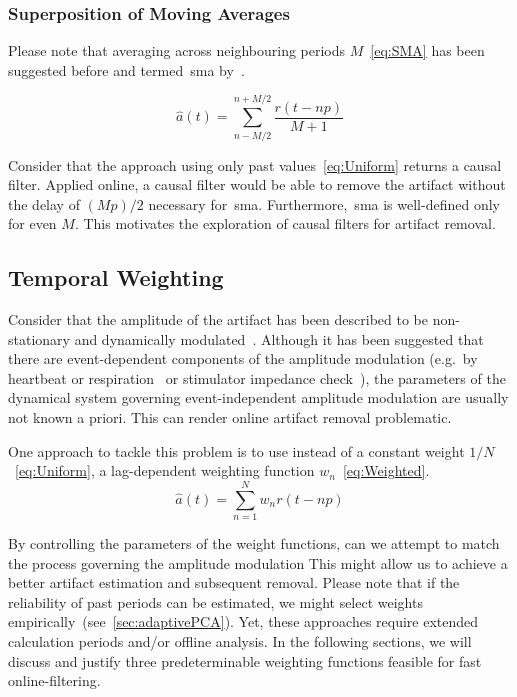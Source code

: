 \documentclass[a4paper]{article}
\newcommand{\secref}[1]{(see~\ref{#1})}
\begin{document}
\subsubsection{Superposition of Moving Averages}\label{sec:sma}

Please note that averaging across neighbouring periods $M$~\eqref{eq:SMA} has been suggested before and termed~\gls{sma} by~\cite{Kohli_2015}.

\begin{equation}
    \hat{a}(t) = \sum_{n-M/2}^{n+M/2} \frac{r(t - np)}{M+1}\label{eq:SMA}
\end{equation}

Consider that the approach using only past values~\eqref{eq:Uniform} returns a causal filter. Applied online, a causal filter would be able to remove the artifact without the delay of $(Mp)/2$ necessary for~\gls{sma}. Furthermore,~\gls{sma} is well-defined only for even $M$. This motivates the exploration of causal filters for artifact removal.

\subsection{Temporal Weighting}

Consider that the amplitude of the  artifact has been described to be non-stationary and dynamically modulated~\citep{Noury_2016,Neuling_2017}.
Although it has been suggested that there are event-dependent components of the amplitude modulation (e.g.\ by heartbeat or respiration~\cite{Noury_2016} or stimulator impedance check~\cite{Neuling_2017}), the parameters of the dynamical system governing event-independent amplitude modulation are usually not known a priori. This can render online artifact removal problematic.

One approach to tackle this problem is to use instead of a constant weight $1/N$~\eqref{eq:Uniform}, a lag-dependent weighting function $w_n$~\eqref{eq:Weighted}.
\begin{equation}
    \hat{a}(t) = \sum_{n=1}^{N} w_n r(t - np)\label{eq:Weighted}
\end{equation}

By controlling the parameters of the weight functions, can we attempt to match the process governing the amplitude modulation
This might allow us to achieve a better artifact estimation and subsequent removal. Please note that if the reliability of past periods can be estimated, we might select weights empirically~\secref{sec:adaptivePCA}.
Yet, these approaches require extended calculation periods and/or offline analysis. In the following sections, we will discuss and justify three predeterminable weighting functions feasible for fast online-filtering.
\end{document}
